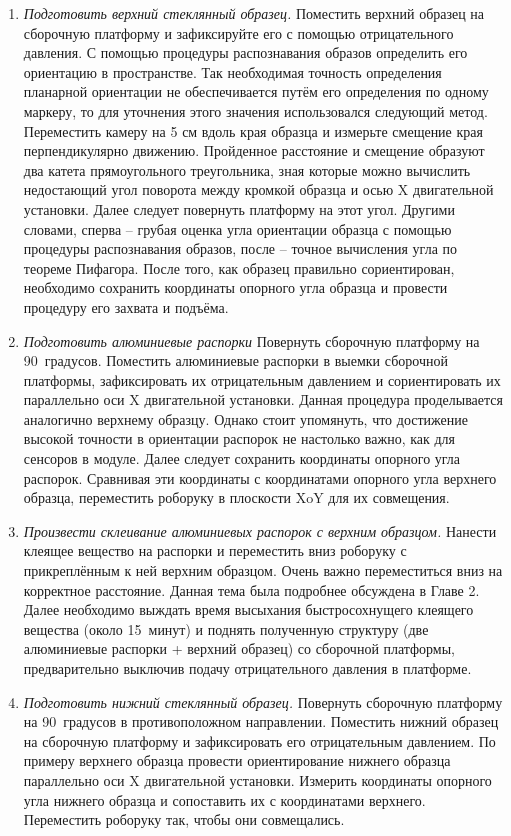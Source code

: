 \begin{enumerate}
\setlength\itemsep{-0.5em}
\item \textit{Подготовить верхний стеклянный образец.} Поместить верхний образец на сборочную платформу и зафиксируйте его с помощью отрицательного давления. С помощью процедуры распознавания образов определить его ориентацию в пространстве. Так необходимая точность определения планарной ориентации не обеспечивается путём его определения по одному маркеру, то для уточнения этого значения использовался следующий метод. Переместить камеру на 5 см вдоль края образца и измерьте смещение края перпендикулярно движению. Пройденное расстояние и смещение образуют два катета прямоугольного треугольника, зная которые можно вычислить недостающий угол поворота между кромкой образца и осью X двигательной установки. Далее следует повернуть платформу на этот угол. Другими словами, сперва -- грубая оценка угла ориентации образца с помощью процедуры распознавания образов, после -- точное вычисления угла по теореме Пифагора. После того, как образец правильно сориентирован, необходимо сохранить координаты опорного угла образца и провести процедуру его захвата и подъёма.
\item \textit{Подготовить алюминиевые распорки} Повернуть сборочную платформу на 90~градусов. Поместить алюминиевые распорки в выемки сборочной платформы, зафиксировать их отрицательным давлением и сориентировать их параллельно оси X двигательной установки. Данная процедура проделывается аналогично верхнему образцу. Однако стоит упомянуть, что достижение высокой точности в ориентации распорок не настолько важно, как для сенсоров в модуле. Далее следует сохранить координаты опорного угла распорок. Сравнивая эти координаты с координатами опорного угла верхнего образца, переместить роборуку в плоскости XoY для их совмещения.
\item \textit{Произвести склеивание алюминиевых распорок с верхним образцом.} Нанести клеящее вещество на распорки и переместить вниз роборуку с прикреплённым к ней верхним образцом. Очень важно переместиться вниз на корректное расстояние. Данная тема была подробнее обсуждена в Главе 2. Далее необходимо выждать время высыхания быстросохнущего клеящего вещества (около 15~минут) и поднять полученную структуру (две алюминиевые распорки + верхний образец) со сборочной платформы, предварительно выключив подачу отрицательного давления в платформе.
\item \textit{Подготовить нижний стеклянный образец.} Повернуть сборочную платформу на 90~градусов в противоположном направлении. Поместить нижний образец на сборочную платформу и зафиксировать его отрицательным давлением. По примеру верхнего образца провести ориентирование нижнего образца параллельно оси X двигательной установки. Измерить координаты опорного угла нижнего образца и сопоставить их с координатами верхнего. Переместить роборуку так, чтобы они совмещались.

\end{enumerate}
